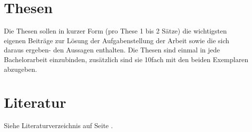 \section{Thesen}
\label{sec:thesen}

Die Thesen sollen in kurzer Form (pro These 1 bis 2 Sätze) die wichtigsten eigenen
Beiträge zur Lösung der Aufgabenstellung der Arbeit sowie die sich daraus ergeben-
den Aussagen enthalten. Die Thesen sind einmal in jede Bachelorarbeit einzubinden,
zusätzlich sind sie 10fach mit den beiden Exemplaren abzugeben.


\section{Literatur}

Siehe Literaturverzeichnis auf Seite \pageref{chap:bib}.
